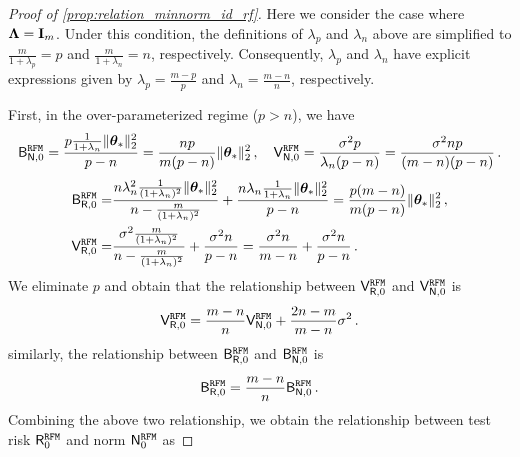 \begin{proof}[Proof of \cref{prop:relation_minnorm_id_rf}]
Here we consider the case where \( {\boldsymbol \Lambda} = {\mathbf I}_m \). Under this condition, the definitions of \( \lambda_p \) and \( \lambda_n \) above are simplified to \( \frac{m}{1+\lambda_p} = p \) and \( \frac{m}{1+\lambda_n} = n \), respectively. Consequently, \( \lambda_p \) and \( \lambda_n \) have explicit expressions given by \( \lambda_p = \frac{m-p}{p} \) and \( \lambda_n = \frac{m-n}{n} \), respectively.

First, in the over-parameterized regime ($p>n$), we have
\[
\begin{aligned}
     \mathsf B^{\tt RFM}_{\mathsf N,0} = \frac{p\frac{1}{1+\lambda_n}\|{\boldsymbol \theta}_*\|_2^2}{p - n} = \frac{np}{m(p-n)} \|{\boldsymbol \theta}_*\|_2^2\,,\quad
    \mathsf V^{\tt RFM}_{\mathsf N,0} = \frac{\sigma^2p}{\lambda_n(p-n)} = \frac{\sigma^2np}{(m-n)(p-n)}\,.
\end{aligned}
\]
\[
\begin{aligned}
     \mathsf B^{\tt RFM}_{\mathsf R,0} =& \frac{n\lambda_n^2 \frac{1}{(1+\lambda_n)^2}\|{\boldsymbol \theta}_*\|_2^2}{n-\frac{m}{(1+\lambda_n)^2}} + \frac{n\lambda_n\frac{1}{1+\lambda_n}\|{\boldsymbol \theta}_*\|_2^2}{p-n} = \frac{p(m-n)}{m(p-n)} \|{\boldsymbol \theta}_*\|_2^2\,,\\ 
     \mathsf V^{\tt RFM}_{\mathsf R,0} =& \frac{\sigma^2\frac{m}{(1+\lambda_n)^2}}{n-\frac{m}{(1+\lambda_n)^2}}+\frac{\sigma^2n}{p-n}=\frac{\sigma^2n}{m-n} + \frac{\sigma^2n}{p-n}\,.
\end{aligned}
\]
We eliminate $p$ and obtain that the relationship between $\mathsf V^{\tt RFM}_{\mathsf R,0}$ and $\mathsf V^{\tt RFM}_{\mathsf N,0}$ is
\[
\begin{aligned}
\mathsf V^{\tt RFM}_{\mathsf R,0} = \frac{m-n}{n}\mathsf V^{\tt RFM}_{\mathsf N,0} + \frac{2n -m}{m-n} \sigma^2\,.
\end{aligned}
\]
similarly, the relationship between $\mathsf B^{\tt RFM}_{\mathsf R,0}$ and $\mathsf B^{\tt RFM}_{\mathsf N,0}$ is
\[
\begin{aligned}
\mathsf B^{\tt RFM}_{\mathsf R,0} = \frac{m-n}{n}\mathsf B^{\tt RFM}_{\mathsf N,0}\,.
\end{aligned}
\]
Combining the above two relationship, we obtain the relationship between test risk $\mathsf R_{0}^{\tt RFM}$ and norm $\mathsf N_{0}^{\tt RFM}$ as


\end{proof}

